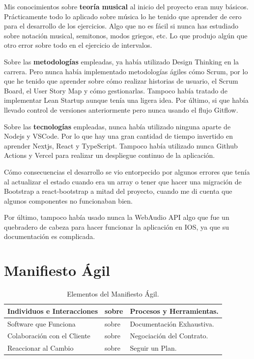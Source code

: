 \documentclass[12pt,twoside,titlepage]{report}
\begin{document}
{Mis conocimientos sobre \textbf{teoría musical} al inicio del proyecto eran muy básicos. Prácticamente todo lo aplicado sobre música lo he tenido que aprender de cero para el desarrollo de los ejercicios. Algo que no es fácil si nunca has estudiado sobre notación musical, semitonos, modos griegos, etc. Lo que produjo algún que otro error sobre todo en el ejercicio de intervalos.

Sobre las \textbf{metodologías} empleadas, ya había utilizado Design Thinking en la carrera. Pero nunca había implementado metodologías ágiles cómo Scrum, por lo que he tenido que aprender sobre cómo realizar historias de usuario, el Scrum Board, el User Story Map y cómo gestionarlas. Tampoco había tratado de implementar Lean Startup aunque tenía una ligera idea. Por último, si que había llevado control de versiones anteriormente pero nunca usando el flujo Gitflow.

Sobre las \textbf{tecnologías} empleadas, nunca había utilizado ninguna aparte de Nodejs y VSCode. Por lo que hay una gran cantidad de tiempo invertido en aprender Nextjs, React y TypeScript. Tampoco había utilizado nunca Github Actions y Vercel para realizar un despliegue continuo de la aplicación. 

Cómo consecuencias el desarrollo se vio entorpecido por algunos errores que tenía al actualizar el estado cuando era un array o tener que hacer una migración de Bootstrap a react-bootstrap a mitad del proyecto, cuando me di cuenta que algunos componentes no funcionaban bien. 

Por último, tampoco había usado nunca la WebAudio API algo que fue un quebradero de cabeza para hacer funcionar la aplicación en IOS, ya que su documentación es complicada.


\chapter{Manifiesto Ágil}
\label{sec:ManifiestoAgil}
\begin{table}[h]
    \begin{center}
        \begin{tabular}{| l | l | l |}
            \hline
            Individuos e Interacciones & sobre & Procesos y Herramientas. \\ \hline
            Software que Funciona & sobre & Documentación Exhaustiva. \\ \hline
            Colaboración con el Cliente & sobre & Negociación del Contrato. \\ \hline
            Reaccionar al Cambio & sobre & Seguir un Plan. \\ \hline
        \end{tabular}
        \caption{Elementos del Manifiesto Ágil.}
        \label{tab:fruta}
    \end{center}
\end{table}

}
\end{document}
